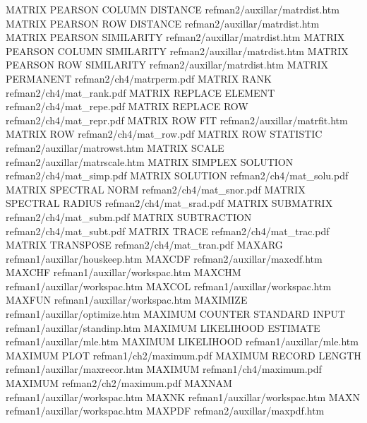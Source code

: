 MATRIX PEARSON COLUMN DISTANCE          refman2/auxillar/matrdist.htm
MATRIX PEARSON ROW DISTANCE             refman2/auxillar/matrdist.htm
MATRIX PEARSON SIMILARITY               refman2/auxillar/matrdist.htm
MATRIX PEARSON COLUMN SIMILARITY        refman2/auxillar/matrdist.htm
MATRIX PEARSON ROW SIMILARITY           refman2/auxillar/matrdist.htm
MATRIX PERMANENT                        refman2/ch4/matrperm.pdf
MATRIX RANK                             refman2/ch4/mat_rank.pdf
MATRIX REPLACE ELEMENT                  refman2/ch4/mat_repe.pdf
MATRIX REPLACE ROW                      refman2/ch4/mat_repr.pdf
MATRIX ROW FIT                          refman2/auxillar/matrfit.htm
MATRIX ROW                              refman2/ch4/mat_row.pdf
MATRIX ROW STATISTIC                    refman2/auxillar/matrowst.htm
MATRIX SCALE                            refman2/auxillar/matrscale.htm
MATRIX SIMPLEX SOLUTION                 refman2/ch4/mat_simp.pdf
MATRIX SOLUTION                         refman2/ch4/mat_solu.pdf
MATRIX SPECTRAL NORM                    refman2/ch4/mat_snor.pdf
MATRIX SPECTRAL RADIUS                  refman2/ch4/mat_srad.pdf
MATRIX SUBMATRIX                        refman2/ch4/mat_subm.pdf
MATRIX SUBTRACTION                      refman2/ch4/mat_subt.pdf
MATRIX TRACE                            refman2/ch4/mat_trac.pdf
MATRIX TRANSPOSE                        refman2/ch4/mat_tran.pdf
MAXARG                                  refman1/auxillar/houskeep.htm
MAXCDF                                  refman2/auxillar/maxcdf.htm
MAXCHF                                  refman1/auxillar/workspac.htm
MAXCHM                                  refman1/auxillar/workspac.htm
MAXCOL                                  refman1/auxillar/workspac.htm
MAXFUN                                  refman1/auxillar/workspac.htm
MAXIMIZE                                refman1/auxillar/optimize.htm
MAXIMUM COUNTER STANDARD INPUT          refman1/auxillar/standinp.htm
MAXIMUM LIKELIHOOD ESTIMATE             refman1/auxillar/mle.htm
MAXIMUM LIKELIHOOD                      refman1/auxillar/mle.htm
MAXIMUM PLOT                            refman1/ch2/maximum.pdf
MAXIMUM RECORD LENGTH                   refman1/auxillar/maxrecor.htm
MAXIMUM                                 refman1/ch4/maximum.pdf
MAXIMUM                                 refman2/ch2/maximum.pdf
MAXNAM                                  refman1/auxillar/workspac.htm
MAXNK                                   refman1/auxillar/workspac.htm
MAXN                                    refman1/auxillar/workspac.htm
MAXPDF                                  refman2/auxillar/maxpdf.htm

